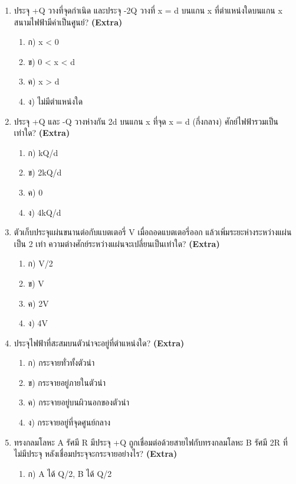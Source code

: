 \documentclass[12pt]{article}
\begin{document}
\begin{enumerate}[label=\arabic*.]
\begin{enumerate}[label=)]
\item ค) 2F₀
\item ง) 0
\end{enumerate}
\item ประจุ +Q วางที่จุดกำเนิด และประจุ -2Q วางที่ x = d บนแกน x ที่ตำแหน่งใดบนแกน x สนามไฟฟ้ามีค่าเป็นศูนย์? \hfill \textbf{\small (Extra)}
\begin{enumerate}[label=)]
\item ก) x < 0
\item ข) 0 < x < d
\item ค) x > d
\item ง) ไม่มีตำแหน่งใด
\end{enumerate}
\item ประจุ +Q และ -Q วางห่างกัน 2d บนแกน x ที่จุด x = d (กึ่งกลาง) ศักย์ไฟฟ้ารวมเป็นเท่าใด? \hfill \textbf{\small (Extra)}
\begin{enumerate}[label=)]
\item ก) kQ/d
\item ข) 2kQ/d
\item ค) 0
\item ง) 4kQ/d
\end{enumerate}
\item ตัวเก็บประจุแผ่นขนานต่อกับแบตเตอรี่ V เมื่อถอดแบตเตอรี่ออก แล้วเพิ่มระยะห่างระหว่างแผ่นเป็น 2 เท่า ความต่างศักย์ระหว่างแผ่นจะเปลี่ยนเป็นเท่าใด? \hfill \textbf{\small (Extra)}
\begin{enumerate}[label=)]
\item ก) V/2
\item ข) V
\item ค) 2V
\item ง) 4V
\end{enumerate}
\item ประจุไฟฟ้าที่สะสมบนตัวนำจะอยู่ที่ตำแหน่งใด? \hfill \textbf{\small (Extra)}
\begin{enumerate}[label=)]
\item ก) กระจายทั่วทั้งตัวนำ
\item ข) กระจายอยู่ภายในตัวนำ
\item ค) กระจายอยู่บนผิวนอกของตัวนำ
\item ง) กระจายอยู่ที่จุดศูนย์กลาง
\end{enumerate}
\item ทรงกลมโลหะ A รัศมี R มีประจุ +Q ถูกเชื่อมต่อด้วยสายไฟกับทรงกลมโลหะ B รัศมี 2R ที่ไม่มีประจุ หลังเชื่อมประจุจะกระจายอย่างไร? \hfill \textbf{\small (Extra)}
\begin{enumerate}[label=)]
\item ก) A ได้ Q/2, B ได้ Q/2

\end{enumerate}
\end{enumerate}
\end{document}
